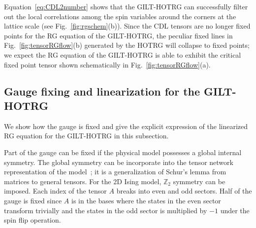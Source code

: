 \documentclass[aps,prr,reprint,superscriptaddress,floatfix]{revtex4-2}
\begin{document}
Equation~\eqref{eq:CDL2number} shows that the GILT-HOTRG can successfully filter out the local correlations among the spin variables around the corners at the lattice scale (see Fig.~\ref{fig:rgschem}(b)).
Since the CDL tensors are no longer fixed points for the RG equation of the GILT-HOTRG, the peculiar fixed lines in Fig.~\ref{fig:tensorRGflow}(b) generated by the HOTRG will collapse to fixed points; we expect the RG equation of the GILT-HOTRG is able to exhibit the critical fixed point tensor shown schematically in Fig.~\ref{fig:tensorRGflow}(a).
%

\subsection{Gauge fixing and linearization for the GILT-HOTRG\label{sec:gaugefix}}
We show how the gauge is fixed and give the explicit expression of the linearized RG equation for the GILT-HOTRG in this subsection.
%

Part of the gauge can be fixed if the physical model possesses a global internal symmetry.
The global symmetry can be incorporate into the tensor network representation of the model~\cite{Singh2010SymTen,Singh2011U1Ten,Singh2012SU2Ten}; it is a generalization of Schur's lemma from matrices to general tensors.
For the 2D Ising model, $\mathbb{Z}_2$ symmetry can be imposed.
Each index of the tensor $A$ breaks into even and odd sectors.
Half of the gauge is fixed since $A$ is in the bases where the states in the even sector transform trivially and
the states in the odd sector is multiplied by $-1$ under the spin flip operation.
%
\end{document}
